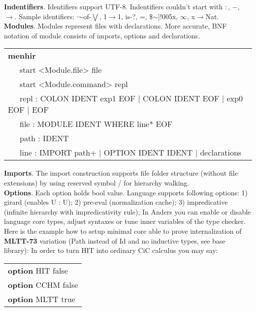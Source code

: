 \documentclass[a4paper,UKenglish,cleveref, autoref, thm-restate]{lipics-v2021}
\newcommand{\tabstyle}[0]{\scriptsize\ttfamily\fontseries{l}\selectfont}
\begin{document}
\textbf{Indentifiers}. Identifiers support UTF-8. Indentifiers couldn't start with $:$, $-$, $\rightarrow$. Sample identifiers:
$\neg$-of-$\bigvee$, 1$\rightarrow$1, is-?, =, \$$\sim$]!005x, $\infty$, x$\rightarrow$Nat.\\

\textbf{Modules}. Modules represent files with declarations. More accurate, BNF notation of module consists of imports, options and declarations.
\begin{table}[ht]
\tabstyle
\begin{tabular}{l}
\textbf{menhir} \\
\ \ \ start <Module.file> file \\
\ \ \ start <Module.command> repl \\
\ \ \ repl : COLON IDENT exp1 EOF | COLON IDENT EOF | exp0 EOF | EOF \\
\ \ \ file : MODULE IDENT WHERE line* EOF \\
\ \ \ path : IDENT \\
\ \ \ line : IMPORT path+ | OPTION IDENT IDENT | declarations \\
\end{tabular}
\end{table}

\textbf{Imports}. The import construction supports file folder structure (without file extensions) by using reserved symbol / for hierarchy walking.\\

\textbf{Options}. Each option holds bool value. Language supports following options: 1) girard (enables U : U); 2) pre-eval (normalization cache);
3) impredicative (infinite hierarchy with impredicativity rule);
In Anders you can enable or disable language core types, adjust syntaxes or tune inner variables of the type checker.
Here is the example how to setup minimal core able to prove internalization of \textbf{MLTT-73} variation (Path instead of Id and no inductive types, see base library):
In order to turn HIT into ordinary CiC calculus you may say:

\begin{table}[ht]
\tabstyle
\begin{tabular}{l}
\textbf{option} HIT false \\
\textbf{option} CCHM false \\
\textbf{option} MLTT true \\
\end{tabular}
\end{table}
\end{document}

